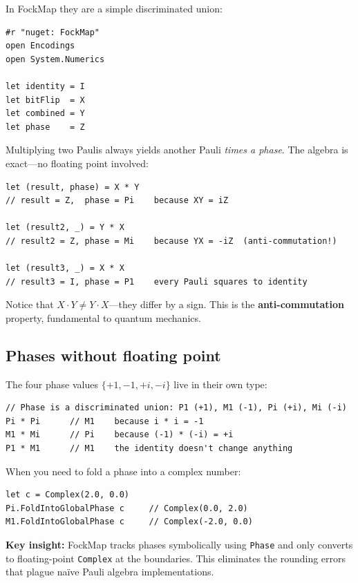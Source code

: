 \documentclass[10pt,a4paper]{article}
\begin{document}
In FockMap they are a simple discriminated union:

\begin{lstlisting}
#r "nuget: FockMap"
open Encodings
open System.Numerics

let identity = I
let bitFlip  = X
let combined = Y
let phase    = Z
\end{lstlisting}

Multiplying two Paulis always yields another Pauli \emph{times a phase}.
The algebra is exact---no floating point involved:

\begin{lstlisting}
let (result, phase) = X * Y
// result = Z,  phase = Pi    because XY = iZ

let (result2, _) = Y * X
// result2 = Z, phase = Mi    because YX = -iZ  (anti-commutation!)

let (result3, _) = X * X
// result3 = I, phase = P1    every Pauli squares to identity
\end{lstlisting}

Notice that $X \cdot Y \neq Y \cdot X$---they differ by a sign.  This
is the \textbf{anti-commutation} property, fundamental to quantum
mechanics.

\subsection{Phases without floating point}

The four phase values $\{+1, -1, +i, -i\}$ live in their own type:

\begin{lstlisting}
// Phase is a discriminated union: P1 (+1), M1 (-1), Pi (+i), Mi (-i)
Pi * Pi      // M1    because i * i = -1
M1 * Mi      // Pi    because (-1) * (-i) = +i
P1 * M1      // M1    the identity doesn't change anything
\end{lstlisting}

When you need to fold a phase into a complex number:

\begin{lstlisting}
let c = Complex(2.0, 0.0)
Pi.FoldIntoGlobalPhase c     // Complex(0.0, 2.0)
M1.FoldIntoGlobalPhase c     // Complex(-2.0, 0.0)
\end{lstlisting}

\textbf{Key insight:} FockMap tracks phases symbolically using
\texttt{Phase} and only converts to floating-point \texttt{Complex} at
the boundaries.  This eliminates the rounding errors that plague na\"ive
Pauli algebra implementations.
\end{document}
